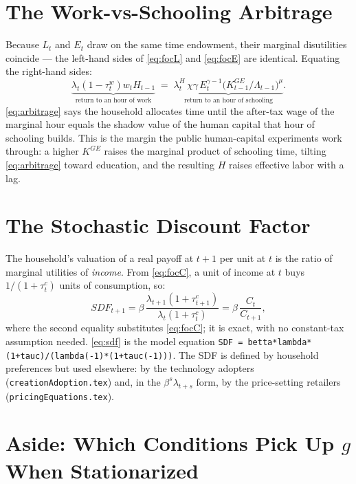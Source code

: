 \documentclass[11pt]{article}
\begin{document}
\section{The Work-vs-Schooling Arbitrage}

Because $L_t$ and $E_t$ draw on the same time endowment, their marginal
disutilities coincide --- the left-hand sides of \eqref{eq:focL} and
\eqref{eq:focE} are identical. Equating the right-hand sides:
\begin{equation}\label{eq:arbitrage}
    \underbrace{\lambda_t \left(1-\tau_t^{w}\right) w_t
    H_{t-1}}_{\text{return to an hour of work}}
    \;=\;
    \underbrace{\lambda_t^{H}\, \chi\gamma\, E_t^{\gamma-1}
    \big(K_{t-1}^{GE}/\Lambda_{t-1}\big)^{\mu}}_{\text{return to an hour of
    schooling}}.
\end{equation}
\eqref{eq:arbitrage} says the household allocates time until the after-tax wage
of the marginal hour equals the shadow value of the human capital that hour of
schooling builds. This is the margin the public human-capital experiments work
through: a higher $K^{GE}$ raises the marginal product of schooling time, tilting
\eqref{eq:arbitrage} toward education, and the resulting $H$ raises effective
labor with a lag.

\section{The Stochastic Discount Factor}

The household's valuation of a real payoff at $t+1$ per unit at $t$ is the ratio
of marginal utilities of \emph{income}. From \eqref{eq:focC}, a unit of income at
$t$ buys $1/(1+\tau^c_t)$ units of consumption, so:
\begin{equation}\label{eq:sdf}
    \mathit{SDF}_{t+1}
    = \beta\,\frac{\lambda_{t+1}\left(1+\tau_{t+1}^{c}\right)}
    {\lambda_t\left(1+\tau_t^{c}\right)}
    = \beta\,\frac{C_t}{C_{t+1}},
\end{equation}
where the second equality substitutes \eqref{eq:focC}; it is exact, with no
constant-tax assumption needed. \eqref{eq:sdf} is the model equation
\texttt{SDF = betta*lambda*(1+tauc)/(lambda(-1)*(1+tauc(-1)))}. The SDF is
defined by household preferences but used elsewhere: by the technology adopters
(\texttt{creationAdoption.tex}) and, in the $\beta^{s}\lambda_{t+s}$ form, by the
price-setting retailers (\texttt{pricingEquations.tex}).

\section{Aside: Which Conditions Pick Up $g$ When Stationarized}
\end{document}
